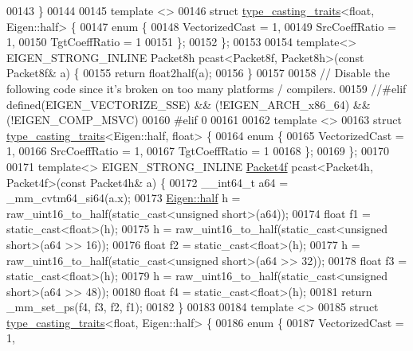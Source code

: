\begin{DoxyCode}
00143 \}
00144 
00145 \textcolor{keyword}{template} <>
00146 \textcolor{keyword}{struct }\hyperlink{struct_eigen_1_1internal_1_1type__casting__traits}{type\_casting\_traits}<float, Eigen::half> \{
00147   \textcolor{keyword}{enum} \{
00148     VectorizedCast = 1,
00149     SrcCoeffRatio = 1,
00150     TgtCoeffRatio = 1
00151   \};
00152 \};
00153 
00154 \textcolor{keyword}{template}<> EIGEN\_STRONG\_INLINE Packet8h pcast<Packet8f, Packet8h>(\textcolor{keyword}{const} Packet8f& a) \{
00155   \textcolor{keywordflow}{return} float2half(a);
00156 \}
00157 
00158 \textcolor{comment}{// Disable the following code since it's broken on too many platforms / compilers.}
00159 \textcolor{comment}{//#elif defined(EIGEN\_VECTORIZE\_SSE) && (!EIGEN\_ARCH\_x86\_64) && (!EIGEN\_COMP\_MSVC)}
00160 \textcolor{preprocessor}{#elif 0}
00161 
00162 \textcolor{keyword}{template} <>
00163 \textcolor{keyword}{struct }\hyperlink{struct_eigen_1_1internal_1_1type__casting__traits}{type\_casting\_traits}<Eigen::half, float> \{
00164   \textcolor{keyword}{enum} \{
00165     VectorizedCast = 1,
00166     SrcCoeffRatio = 1,
00167     TgtCoeffRatio = 1
00168   \};
00169 \};
00170 
00171 \textcolor{keyword}{template}<> EIGEN\_STRONG\_INLINE \hyperlink{struct_eigen_1_1internal_1_1_packet4f}{Packet4f} pcast<Packet4h, Packet4f>(\textcolor{keyword}{const} Packet4h& a) \{
00172   \_\_int64\_t a64 = \_mm\_cvtm64\_si64(a.x);
00173   \hyperlink{struct_eigen_1_1half}{Eigen::half} h = raw\_uint16\_to\_half(static\_cast<unsigned short>(a64));
00174   \textcolor{keywordtype}{float} f1 = \textcolor{keyword}{static\_cast<}\textcolor{keywordtype}{float}\textcolor{keyword}{>}(h);
00175   h = raw\_uint16\_to\_half(static\_cast<unsigned short>(a64 >> 16));
00176   \textcolor{keywordtype}{float} f2 = \textcolor{keyword}{static\_cast<}\textcolor{keywordtype}{float}\textcolor{keyword}{>}(h);
00177   h = raw\_uint16\_to\_half(static\_cast<unsigned short>(a64 >> 32));
00178   \textcolor{keywordtype}{float} f3 = \textcolor{keyword}{static\_cast<}\textcolor{keywordtype}{float}\textcolor{keyword}{>}(h);
00179   h = raw\_uint16\_to\_half(static\_cast<unsigned short>(a64 >> 48));
00180   \textcolor{keywordtype}{float} f4 = \textcolor{keyword}{static\_cast<}\textcolor{keywordtype}{float}\textcolor{keyword}{>}(h);
00181   \textcolor{keywordflow}{return} \_mm\_set\_ps(f4, f3, f2, f1);
00182 \}
00183 
00184 \textcolor{keyword}{template} <>
00185 \textcolor{keyword}{struct }\hyperlink{struct_eigen_1_1internal_1_1type__casting__traits}{type\_casting\_traits}<float, Eigen::half> \{
00186   \textcolor{keyword}{enum} \{
00187     VectorizedCast = 1,

\end{DoxyCode}
